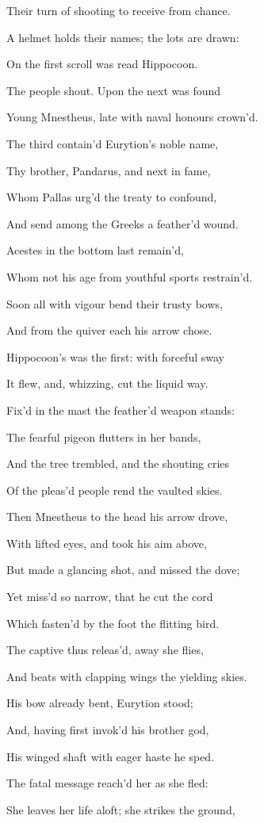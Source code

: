 Their turn of shooting to receive from chance.

A helmet holds their names; the lots are drawn:

On the first scroll was read Hippocoon.

The people shout. Upon the next was found

Young Mnestheus, late with naval honours crown’d.

The third contain’d Eurytion’s noble name,

Thy brother, Pandarus, and next in fame,

Whom Pallas urg’d the treaty to confound,

And send among the Greeks a feather’d wound.

Acestes in the bottom last remain’d,

Whom not his age from youthful sports restrain’d.

Soon all with vigour bend their trusty bows,

And from the quiver each his arrow chose.

Hippocoon’s was the first: with forceful sway

It flew, and, whizzing, cut the liquid way.

Fix’d in the mast the feather’d weapon stands:

The fearful pigeon flutters in her bands,

And the tree trembled, and the shouting cries

Of the pleas’d people rend the vaulted skies.

Then Mnestheus to the head his arrow drove,

With lifted eyes, and took his aim above,

But made a glancing shot, and missed the dove;

Yet miss’d so narrow, that he cut the cord

Which fasten’d by the foot the flitting bird.

The captive thus releas’d, away she flies,

And beats with clapping wings the yielding skies.

His bow already bent, Eurytion stood;

And, having first invok’d his brother god,

His winged shaft with eager haste he sped.

The fatal message reach’d her as she fled:

She leaves her life aloft; she strikes the ground,

